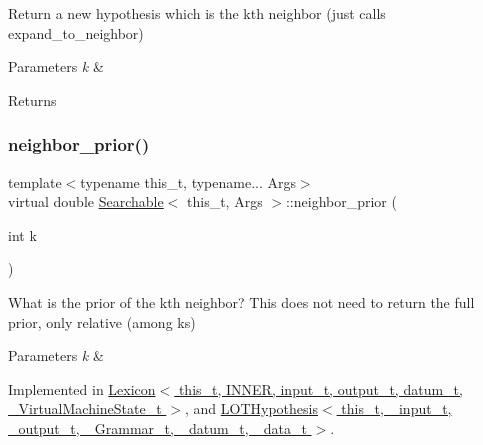Return a new hypothesis which is the k\textquotesingle{}th neighbor (just calls expand\+\_\+to\+\_\+neighbor) 


\begin{DoxyParams}{Parameters}
{\em k} & \\
\hline
\end{DoxyParams}
\begin{DoxyReturn}{Returns}

\end{DoxyReturn}
\mbox{\label{class_searchable_aa6f72073717a4df0d22c73705555b13a}} 
\subsubsection{\texorpdfstring{neighbor\+\_\+prior()}{neighbor\_prior()}}
{\footnotesize\ttfamily template$<$typename this\+\_\+t, typename... Args$>$ \\
virtual double \hyperlink{class_searchable}{Searchable}$<$ this\+\_\+t, Args $>$\+::neighbor\+\_\+prior (\begin{DoxyParamCaption}\item[{int}]{k }\end{DoxyParamCaption})\hspace{0.3cm}{\ttfamily [pure virtual]}}



What is the prior of the k\textquotesingle{}th neighbor? This does not need to return the full prior, only relative (among ks) 


\begin{DoxyParams}{Parameters}
{\em k} & \\
\hline
\end{DoxyParams}


Implemented in \hyperlink{class_lexicon_ac4cb2e1a2db91e0aa8984aa5aaad70a9}{Lexicon$<$ this\+\_\+t, I\+N\+N\+E\+R, input\+\_\+t, output\+\_\+t, datum\+\_\+t, \+\_\+\+Virtual\+Machine\+State\+\_\+t $>$}, and \hyperlink{class_l_o_t_hypothesis_a7c0e1a289a9166e4d2470f2e700a475d}{L\+O\+T\+Hypothesis$<$ this\+\_\+t, \+\_\+input\+\_\+t, \+\_\+output\+\_\+t, \+\_\+\+Grammar\+\_\+t, \+\_\+datum\+\_\+t, \+\_\+data\+\_\+t $>$}.

\mbox{\label{class_searchable_a68819cd23119615baa51d65451765c74}} 
